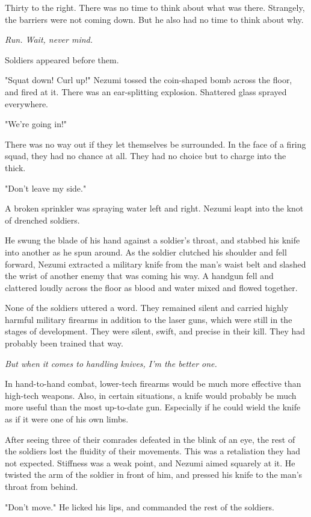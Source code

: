 Thirty to the right. There was no time to think about what was there.
Strangely, the barriers were not coming down. But he also had no time to
think about why.

\emph{Run. Wait, never mind.}

Soldiers appeared before them.

"Squat down! Curl up!" Nezumi tossed the coin-shaped bomb across the
floor, and fired at it. There was an ear-splitting explosion. Shattered
glass sprayed everywhere.

"We're going in!"

There was no way out if they let themselves be surrounded. In the face
of a firing squad, they had no chance at all. They had no choice but to
charge into the thick.

"Don't leave my side."

A broken sprinkler was spraying water left and right. Nezumi leapt into
the knot of drenched soldiers.

He swung the blade of his hand against a soldier's throat, and stabbed
his knife into another as he spun around. As the soldier clutched his
shoulder and fell forward, Nezumi extracted a military knife from the
man's waist belt and slashed the wrist of another enemy that was coming
his way. A handgun fell and clattered loudly across the floor as blood
and water mixed and flowed together.

None of the soldiers uttered a word. They remained silent and carried
highly harmful military firearms in addition to the laser guns, which
were still in the stages of development. They were silent, swift, and
precise in their kill. They had probably been trained that way.

\emph{But when it comes to handling knives, I'm the better one.}

In hand-to-hand combat, lower-tech firearms would be much more effective
than high-tech weapons. Also, in certain situations, a knife would
probably be much more useful than the most up-to-date gun. Especially if
he could wield the knife as if it were one of his own limbs.

After seeing three of their comrades defeated in the blink of an eye,
the rest of the soldiers lost the fluidity of their movements. This was
a retaliation they had not expected. Stiffness was a weak point, and
Nezumi aimed squarely at it. He twisted the arm of the soldier in front
of him, and pressed his knife to the man's throat from behind.

"Don't move." He licked his lips, and commanded the rest of the
soldiers.

